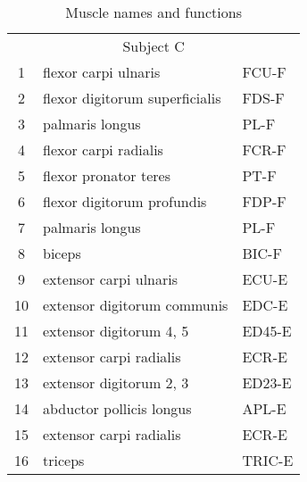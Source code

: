 \begin{table}[ht]
\begin{tabular}{cll}
			\midrule
			\multicolumn{3}{c}{Subject C} \\
			1  &	flexor carpi ulnaris            &	FCU-F\\
			2  &  	flexor digitorum superficialis	&	FDS-F\\
			3  &	palmaris longus                 &	PL-F\\ 
			4  &	flexor carpi radialis 	        &	FCR-F\\
			5  &	flexor pronator teres 	        &	PT-F\\
			6  &	flexor digitorum profundis      &	FDP-F\\
			7  &	palmaris longus 	            &	PL-F\\
			8  &	biceps 		                    &	BIC-F\\
			9  &	extensor carpi ulnaris		    &	ECU-E\\
			10 & 	extensor digitorum communis 	&	EDC-E\\
			11 & 	extensor digitorum 4, 5			&	ED45-E\\
			12 &	extensor carpi radialis 		&	ECR-E\\
			13 & 	extensor digitorum 2, 3 		&	ED23-E\\
			14 & 	abductor pollicis longus		&	APL-E\\
			15 &	extensor carpi radialis 		&	ECR-E\\
			16 & 	triceps 			            &	TRIC-E\\
		\bottomrule
 	\end{tabular}
 	\caption{Muscle names and functions}
 	\label{app:tab:muscle_naming}
\end{table}

